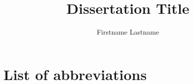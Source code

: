 \documentclass{phdunitartu}
\author{Firstname Lastname}
\title{Dissertation Title}
\institute{Institute of Computer Science} %
\affiliation{University of Tartu}
\begin{document}
    \maketitle
    \thispagestyle{empty}
    
    \setcounter{page}{6}
    
    
    \tableofcontents
    \listoffigures
    \listoftables
    \chapter*{List of abbreviations}
    \IfThesisTypeIsCollection{}{}
    
    
    
    
    
    
    
    
    
    \nocite{*} %
    

    \appendix
    
    
    
    \setcounter{secnumdepth}{-1}
    
    \IfThesisTypeIsCollection{}{}
    
    \IfThesisTypeIsCollection{}{}
\end{document}
